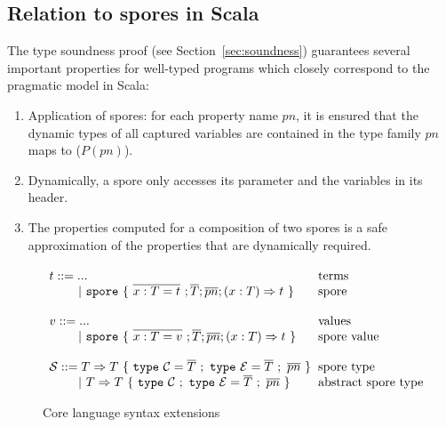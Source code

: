 \documentclass[runningheads]{llncs}
\newcommand{\seq}[1]{\overline{#1}}
\newcommand{\ba}{\begin{array}}
\newcommand{\ea}{\end{array}}
\newcommand{\gap}{\quad\quad}
\begin{document}
\begin{sloppypar}
\subsection{Relation to spores in Scala}

The type soundness proof (see Section~\ref{sec:soundness}) guarantees several important properties for well-typed programs which closely correspond to the pragmatic model in Scala:

\begin{enumerate}

\item Application of spores: for each property name $pn$, it is ensured that the dynamic types of all captured variables are contained in the type family $pn$ maps to ($P(pn)$).

\item Dynamically, a spore only accesses its parameter and the variables in its header.

\item The properties computed for a composition of two spores is a safe approximation of the properties that are dynamically required.

\end{enumerate}



\vspace{2mm}
\begin{figure}[ht!]
  \centering

  $\ba[t]{l@{\hspace{2mm}}l}
t ::=     ...                               & \mbox{terms}
\\
\gap ~|~  \texttt{spore}~\{~\seq{x : T = t}~; \seq{T}; \seq{pn} ; (x: T) \Rightarrow t~\}  & \mbox{spore}
\\
 & \\
v ::=     ...                               & \mbox{values}
\\
\gap ~|~  \texttt{spore}~\{~\seq{x : T = v}~; \seq{T}; \seq{pn} ; (x: T) \Rightarrow t~\}  & \mbox{spore value}
\\
 & \\
\mathcal{S} ::= T \Rightarrow T~\{~\texttt{type}~\mathcal{C} = \seq{T}~;~\texttt{type}~\mathcal{E} = \seq{T}~;~\seq{pn}~\}   & \mbox{spore type}
\\
\gap ~|~  T \Rightarrow T~\{~\texttt{type}~\mathcal{C}~;~\texttt{type}~\mathcal{E} = \seq{T}~;~\seq{pn}~\}   & \mbox{abstract spore type}
\\
\ea$

  \vspace{2mm}
  \caption{Core language syntax extensions}
  \label{fig:syntax-ext}
  \vspace{-3mm}
\end{figure}



\end{sloppypar}
\end{document}
